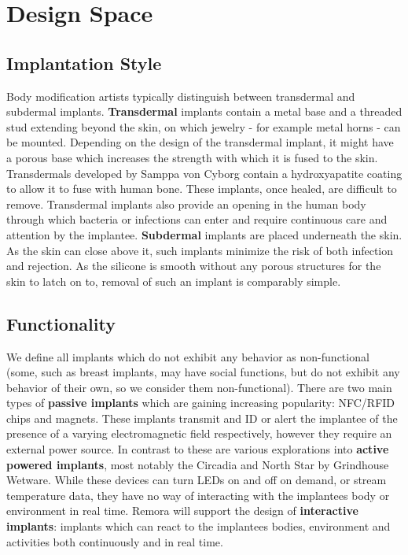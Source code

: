 \documentclass[runningheads,a4paper]{llncs}
\begin{document}
\section{Design Space}
\subsection{Implantation Style}
Body modification artists typically distinguish between transdermal and subdermal implants. \textbf{Transdermal} implants contain a metal base and a threaded stud extending beyond the skin, on which jewelry - for example metal horns - can be mounted. Depending on the design of the transdermal implant, it might have a porous base which increases the strength with which it is fused to the skin. Transdermals developed by Samppa von Cyborg contain a hydroxyapatite coating to allow it to fuse with human bone. These implants, once healed, are difficult to remove. Transdermal implants also provide an opening in the human body through which bacteria or infections can enter and require continuous care and attention by the implantee. \textbf{Subdermal} implants are placed underneath the skin. As the skin can close above it, such implants minimize the risk of both infection and rejection. As the silicone is smooth without any porous structures for the skin to latch on to, removal of such an implant is comparably simple.
\subsection{Functionality}
We define all implants which do not exhibit any behavior as non-functional (some, such as breast implants, may have social functions, but do not exhibit any behavior of their own, so we consider them non-functional). There are two main types of \textbf{passive implants} which are gaining increasing popularity: NFC/RFID chips and magnets. These implants transmit and ID or alert the implantee of the presence of a varying electromagnetic field respectively, however they require an external power source. In contrast to these are various explorations into \textbf{active powered implants}, most notably the Circadia and North Star by Grindhouse Wetware. While these devices can turn LEDs on and off on demand, or stream temperature data, they have no way of interacting with the implantees body or environment in real time. Remora will support the design of \textbf{interactive implants}: implants which can react to the implantees bodies, environment and activities both continuously and in real time. 
\end{document}
